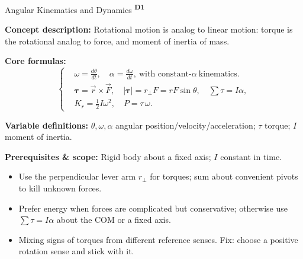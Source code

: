 ﻿\documentclass[12pt,a4paper]{article}
\providecommand{\KPFormulas}{}
\providecommand{\KPHeuristics}{}
\newcommand{\DOne}{\texorpdfstring{\textsuperscript{\textbf{D1}}}{ D1}}
\begin{document}

\begin{KnowledgePoint}{Angular Kinematics and Dynamics \DOne}
  \KPFormulas
  \begin{formulabox}
  \textbf{Concept description:} Rotational motion is analog to linear motion: torque is the rotational analog to force, and moment of inertia of mass.

  \textbf{Core formulas:}
  \[
  \left\{\begin{aligned}
    &\omega=\frac{d\theta}{dt},\quad \alpha=\frac{d\omega}{dt},\ \text{with constant-}\alpha\ \text{kinematics}.\\
&\boldsymbol{\tau}=\vec r\times\vec F,\quad |\boldsymbol{\tau}|=r_\perp F=rF\sin\theta,\quad \sum \tau=I\alpha,\\
    &K_r=\tfrac12 I\omega^2,\quad P=\tau\,\omega.
  \end{aligned}\right.
  \]

  \textbf{Variable definitions:} $\theta,\omega,\alpha$ angular position/velocity/acceleration; $\tau$ torque; $I$ moment of inertia.

  
  
  \textbf{Prerequisites \& scope:} Rigid body about a fixed axis; $I$ constant in time.
  \end{formulabox}

  \KPHeuristics
  \begin{heuristicsbox}
  \begin{itemize}[leftmargin=*]
    \item Use the perpendicular lever arm $r_\perp$ for torques; sum about convenient pivots to kill unknown forces.
    \item Prefer energy when forces are complicated but conservative; otherwise use $\sum \tau=I\alpha$ about the COM or a fixed axis.
  \end{itemize}
  \vspace{0.4em}
  \begin{itemize}[leftmargin=*]
    \item Mixing signs of torques from different reference senses. Fix: choose a positive rotation sense and stick with it.
  \end{itemize}
  \end{heuristicsbox}


\end{KnowledgePoint}
\end{document}
